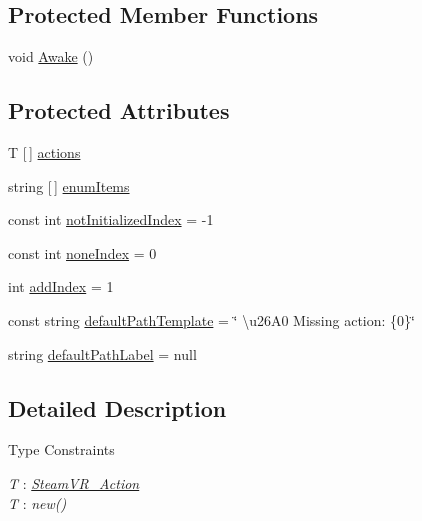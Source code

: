 \subsection*{Protected Member Functions}
\begin{DoxyCompactItemize}
\item 
void \mbox{\hyperlink{class_valve_1_1_v_r_1_1_steam_v_r___input___action___generic_property_editor_abed3282b52020f3aed9ac0a45ccc7d31}{Awake}} ()
\end{DoxyCompactItemize}
\subsection*{Protected Attributes}
\begin{DoxyCompactItemize}
\item 
T \mbox{[}$\,$\mbox{]} \mbox{\hyperlink{class_valve_1_1_v_r_1_1_steam_v_r___input___action___generic_property_editor_a3b0ec4a4489c469cbf1a8fd74c2c9c3d}{actions}}
\item 
string \mbox{[}$\,$\mbox{]} \mbox{\hyperlink{class_valve_1_1_v_r_1_1_steam_v_r___input___action___generic_property_editor_a5ec066ad7e0cf4339e3dd4a4793dc595}{enum\+Items}}
\item 
const int \mbox{\hyperlink{class_valve_1_1_v_r_1_1_steam_v_r___input___action___generic_property_editor_ab14e59839e0fa1be62631b32eaf40f39}{not\+Initialized\+Index}} = -\/1
\item 
const int \mbox{\hyperlink{class_valve_1_1_v_r_1_1_steam_v_r___input___action___generic_property_editor_a6ac08fdbb7a167744ddba748c3911fc5}{none\+Index}} = 0
\item 
int \mbox{\hyperlink{class_valve_1_1_v_r_1_1_steam_v_r___input___action___generic_property_editor_af98402b5ecf07ded3cf4e5e50712d8a2}{add\+Index}} = 1
\item 
const string \mbox{\hyperlink{class_valve_1_1_v_r_1_1_steam_v_r___input___action___generic_property_editor_a2f7d2fd47bb4721792c799f86d2ec6d5}{default\+Path\+Template}} = \char`\"{} \textbackslash{}u26\+A0 Missing action\+: \{0\}\char`\"{}
\item 
string \mbox{\hyperlink{class_valve_1_1_v_r_1_1_steam_v_r___input___action___generic_property_editor_a5e3cad9309efe5a3675c0f83e8f25ec7}{default\+Path\+Label}} = null
\end{DoxyCompactItemize}


\subsection{Detailed Description}
\begin{Desc}
\item[Type Constraints]\begin{description}
\item[{\em T} : {\em \mbox{\hyperlink{class_valve_1_1_v_r_1_1_steam_v_r___action}{Steam\+V\+R\+\_\+\+Action}}}]\item[{\em T} : {\em new()}]\end{description}
\end{Desc}


